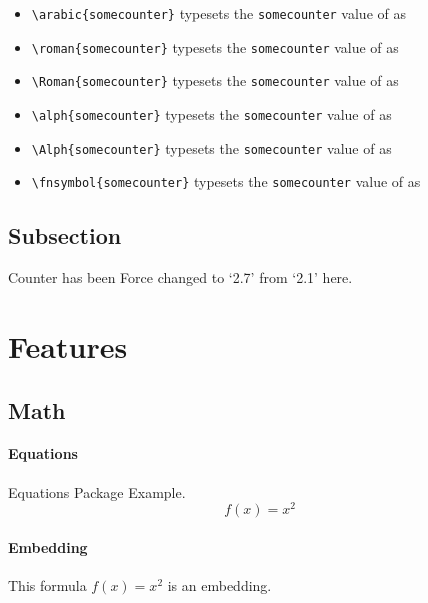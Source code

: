 \documentclass{report}[a4paper,12pt] %
\begin{document}
\setcounter{somecounter}{9}
\begin{itemize}
    \item \verb|\arabic{somecounter}| typesets the \texttt{somecounter} value of  \thesomecounter{} as  
    \item \verb|\roman{somecounter}| typesets the \texttt{somecounter} value of  \thesomecounter{} as  
    \item \verb|\Roman{somecounter}| typesets the \texttt{somecounter} value of  \thesomecounter{} as  
    \item \verb|\alph{somecounter}| typesets the \texttt{somecounter} value of  \thesomecounter{} as  
   \item \verb|\Alph{somecounter}| typesets the \texttt{somecounter} value of  \thesomecounter{} as  
    \item \verb|\fnsymbol{somecounter}| typesets the \texttt{somecounter} value of  \thesomecounter{} as  
\end{itemize}

\setcounter{subsection}{6}
\subsection{Subsection}
Counter has been Force changed to `2.7' from `2.1' here.

\section{Features}

\subsection{Math}

\paragraph{Equations}
Equations Package Example.
\begin{equation}
  f(x) = x^2
\end{equation}

\paragraph{Embedding}

This formula $f(x) = x^2$ is an embedding.
\end{document}

